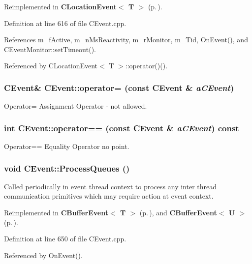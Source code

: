 Reimplemented in {\bf CLocation\-Event$<$ T $>$} {\rm (p.\,\pageref{classCLocationEvent_b0})}.

Definition at line 616 of file CEvent.cpp.

References m\_\-f\-Active, m\_\-n\-Ms\-Reactivity, m\_\-r\-Monitor, m\_\-Tid, On\-Event(), and CEvent\-Monitor::set\-Timeout().

Referenced by CLocation\-Event$<$ T $>$::operator()().
\subsubsection{\setlength{\rightskip}{0pt plus 5cm}CEvent\& CEvent::operator= (const CEvent \& {\em a\-CEvent})\hspace{0.3cm}{\tt  [private]}}\label{classCEvent_c1}


Operator= Assignment Operator - not allowed.

\subsubsection{\setlength{\rightskip}{0pt plus 5cm}int CEvent::operator== (const CEvent \& {\em a\-CEvent}) const\hspace{0.3cm}{\tt  [private]}}\label{classCEvent_c2}


Operator== Equality Operator no point.

\subsubsection{\setlength{\rightskip}{0pt plus 5cm}void CEvent::Process\-Queues ()\hspace{0.3cm}{\tt  [protected, virtual]}}\label{classCEvent_b5}


Called periodically in event thread context to process any  inter thread communication primitives which may require action at event context. 

Reimplemented in {\bf CBuffer\-Event$<$ T $>$} {\rm (p.\,\pageref{classCBufferEvent_b0})}, and {\bf CBuffer\-Event$<$ U $>$} {\rm (p.\,\pageref{classCBufferEvent_b0})}.

Definition at line 650 of file CEvent.cpp.

Referenced by On\-Event().
